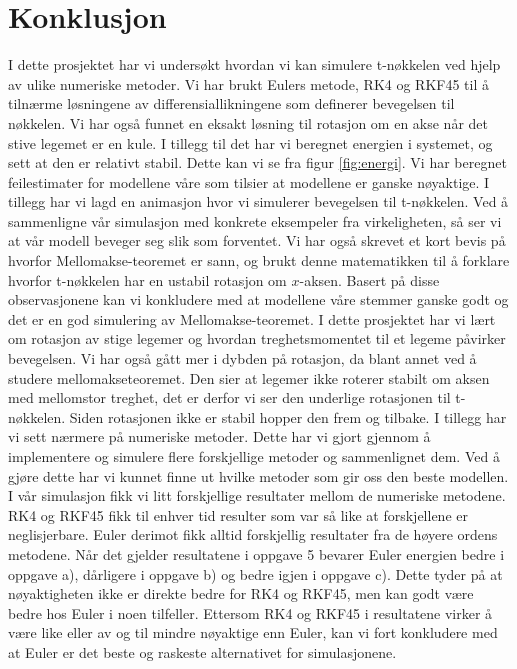 \section{Konklusjon}
I dette prosjektet har vi undersøkt hvordan vi kan simulere t-nøkkelen ved hjelp av ulike numeriske metoder. Vi har brukt Eulers metode, RK4 og RKF45 til å tilnærme løsningene av differensiallikningene som definerer bevegelsen til nøkkelen. Vi har også funnet en eksakt løsning til rotasjon om en akse når det stive legemet er en kule. I tillegg til det har vi beregnet energien i systemet, og sett at den er relativt stabil. Dette kan vi se fra figur \ref{fig:energi}.\newline\newline
Vi har beregnet feilestimater for modellene våre som tilsier at modellene er ganske nøyaktige. I tillegg har vi lagd en animasjon hvor vi simulerer bevegelsen til t-nøkkelen. Ved å sammenligne vår simulasjon med konkrete eksempeler fra virkeligheten, så ser vi at vår modell beveger seg slik som forventet. Vi har også skrevet et kort bevis på hvorfor Mellomakse-teoremet er sann, og brukt denne matematikken til å forklare hvorfor t-nøkkelen har en ustabil rotasjon om $x$-aksen. Basert på disse observasjonene kan vi konkludere med at modellene våre stemmer ganske godt og det er en god simulering av Mellomakse-teoremet.\newline\newline
I dette prosjektet har vi lært om rotasjon av stige legemer og hvordan treghetsmomentet til et legeme påvirker bevegelsen. Vi har også gått mer i dybden på rotasjon, da blant annet ved å studere mellomakseteoremet. Den sier at legemer ikke roterer stabilt om aksen med mellomstor treghet, det er derfor vi ser den underlige rotasjonen til t-nøkkelen. Siden rotasjonen ikke er stabil hopper den frem og tilbake.\newline\newline
I tillegg har vi sett nærmere på numeriske metoder. Dette har vi gjort gjennom å implementere og simulere flere forskjellige metoder og sammenlignet dem. Ved å gjøre dette har vi kunnet finne ut hvilke metoder som gir oss den beste modellen. I vår simulasjon fikk vi litt forskjellige resultater mellom de numeriske metodene. RK4 og RKF45 fikk til enhver tid resulter som var så like at forskjellene er neglisjerbare. Euler derimot fikk alltid forskjellig resultater fra de høyere ordens metodene. Når det gjelder resultatene i oppgave 5 bevarer Euler energien bedre i oppgave a), dårligere i oppgave b) og bedre igjen i oppgave c). Dette tyder på at nøyaktigheten ikke er direkte bedre for RK4 og RKF45, men kan godt være bedre hos Euler i noen tilfeller. Ettersom RK4 og RKF45 i resultatene virker å være like eller av og til mindre nøyaktige enn Euler, kan vi fort konkludere med at Euler er det beste og raskeste alternativet for simulasjonene.\newline\newline